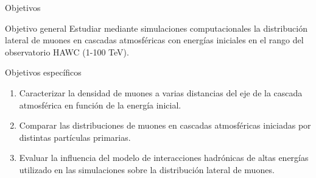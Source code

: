 \documentclass[10pt,xcolor=table]{beamer}
\begin{document}
	
\begin{frame}{Objetivos}
	\begin{block}{Objetivo general}
	Estudiar mediante simulaciones computacionales la distribución lateral de muones en cascadas atmosféricas con energías iniciales en el rango del observatorio HAWC (1-100 TeV).
	\end{block}
	\vspace{0.3 cm}
	\begin{block}{Objetivos espec\'ificos}
		\begin{enumerate}
		\item Caracterizar la densidad de muones a varias distancias del eje de la cascada atmosf\'erica en funci\'on de la energ\'ia inicial. \vspace{0.1 cm}
		\item Comparar las distribuciones de muones en cascadas atmosf\'ericas iniciadas por distintas part\'iculas primarias. \vspace{0.1 cm}
		\item Evaluar la influencia del modelo de interacciones hadr\'onicas de altas energ\'ias utilizado en las simulaciones sobre la distribuci\'on lateral de muones. \vspace{0.1 cm}
		\end{enumerate}
	\end{block}
\end{frame}
\end{document}
